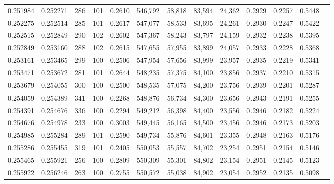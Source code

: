 \begin{tabular}{rrrrrrrrrrrrr}
0.251984 & 0.252271 &   286 & 101 &                                     0.2610 & 546,792 &  58,818 &  83,594 &  24,362 & 0.2929 & 0.2257 & 0.5448 \\
0.252275 & 0.252514 &   285 & 101 &                                     0.2617 & 547,077 &  58,533 &  83,695 &  24,261 & 0.2930 & 0.2247 & 0.5422 \\
0.252515 & 0.252849 &   290 & 102 &                                     0.2602 & 547,367 &  58,243 &  83,797 &  24,159 & 0.2932 & 0.2238 & 0.5395 \\
0.252849 & 0.253160 &   288 & 102 &                                     0.2615 & 547,655 &  57,955 &  83,899 &  24,057 & 0.2933 & 0.2228 & 0.5368 \\
0.253161 & 0.253465 &   299 & 100 &                                     0.2506 & 547,954 &  57,656 &  83,999 &  23,957 & 0.2935 & 0.2219 & 0.5341 \\
0.253471 & 0.253672 &   281 & 101 &                                     0.2644 & 548,235 &  57,375 &  84,100 &  23,856 & 0.2937 & 0.2210 & 0.5315 \\
0.253679 & 0.254055 &   300 & 100 &                                     0.2500 & 548,535 &  57,075 &  84,200 &  23,756 & 0.2939 & 0.2201 & 0.5287 \\
0.254059 & 0.254389 &   341 & 100 &                                     0.2268 & 548,876 &  56,734 &  84,300 &  23,656 & 0.2943 & 0.2191 & 0.5255 \\
0.254391 & 0.254676 &   336 & 100 &                                     0.2294 & 549,212 &  56,398 &  84,400 &  23,556 & 0.2946 & 0.2182 & 0.5224 \\
0.254676 & 0.254978 &   233 & 100 &                                     0.3003 & 549,445 &  56,165 &  84,500 &  23,456 & 0.2946 & 0.2173 & 0.5203 \\
0.254985 & 0.255284 &   289 & 101 &                                     0.2590 & 549,734 &  55,876 &  84,601 &  23,355 & 0.2948 & 0.2163 & 0.5176 \\
0.255286 & 0.255455 &   319 & 101 &                                     0.2405 & 550,053 &  55,557 &  84,702 &  23,254 & 0.2951 & 0.2154 & 0.5146 \\
0.255465 & 0.255921 &   256 & 100 &                                     0.2809 & 550,309 &  55,301 &  84,802 &  23,154 & 0.2951 & 0.2145 & 0.5123 \\
0.255922 & 0.256246 &   263 & 100 &                                     0.2755 & 550,572 &  55,038 &  84,902 &  23,054 & 0.2952 & 0.2135 & 0.5098 \\

\end{tabular}
